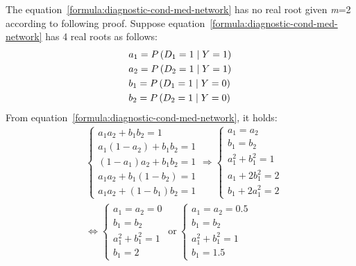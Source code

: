 \documentclass{article}
\numberwithin{equation}{section}
\numberwithin{figure}{section}
\numberwithin{table}{section}
\begin{document}
The equation~\ref{formula:diagnostic-cond-med-network} has no real root given \textit{m}=2 according to following proof. Suppose equation~\ref{formula:diagnostic-cond-med-network} has 4 real roots as follows:
\begin{align*}
&a_1=P\left(D_1=1\mathrel{\left|\vphantom{D_1=1 Y=1}\right.\kern-\nulldelimiterspace}Y=1\right)\\
&a_2=P\left(D_2=1\mathrel{\left|\vphantom{D_2=1 Y=1}\right.\kern-\nulldelimiterspace}Y=1\right)\\
&b_1=P\left(D_1=1\mathrel{\left|\vphantom{D_1=1 Y=0}\right.\kern-\nulldelimiterspace}Y=0\right)\\
&b_2=P\left(D_2=1\mathrel{\left|\vphantom{D_2=1 Y=0}\right.\kern-\nulldelimiterspace}Y=0\right)
\end{align*}
From equation~\ref{formula:diagnostic-cond-med-network}, it holds:
\begin{align*}
&\left\{ \begin{array}{l}
a_1a_2+b_1b_2=1 \\ 
a_1\left(1-a_2\right)+b_1b_2=1 \\ 
\left(1-a_1\right)a_2+b_1b_2=1 \\ 
a_1a_2+b_1\left(1-b_2\right)=1 \\ 
a_1a_2+\left(1-b_1\right)b_2=1 \end{array}
\right.\Rightarrow \left\{ \begin{array}{l}
a_1=a_2 \\ 
b_1=b_2 \\ 
a^2_1+b^2_1=1 \\ 
a_1+2b^2_1=2 \\ 
b_1+2a^2_1=2 \end{array}
\right.\\
&\Leftrightarrow \left\{ \begin{array}{l}
a_1=a_2=0 \\ 
b_1=b_2 \\ 
a^2_1+b^2_1=1 \\ 
b_1=2 \end{array}
\right.\ \mathrm{or}\ \left\{ \begin{array}{l}
a_1=a_2=0.5 \\ 
b_1=b_2 \\ 
a^2_1+b^2_1=1 \\ 
b_1=1.5 \end{array}
\right.
\end{align*}
\end{document}
